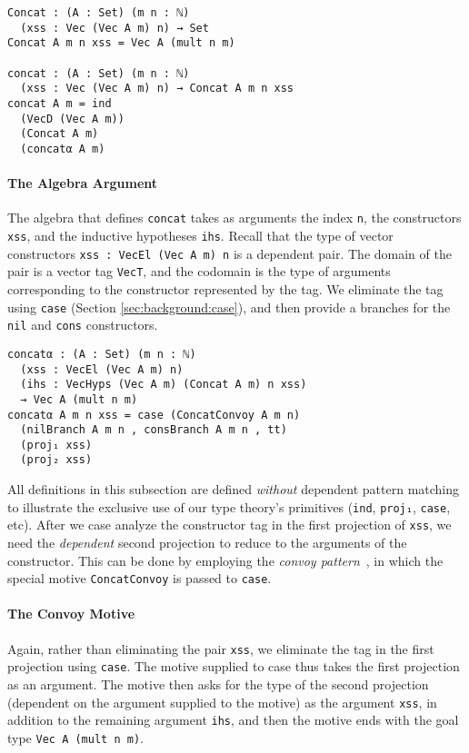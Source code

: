 \documentclass[preprint,nonatbib]{sigplanconf}
\newcommand{\refsec}[1]{Section \ref{sec:#1}}
\begin{document}
\begin{verbatim}
Concat : (A : Set) (m n : ℕ)
  (xss : Vec (Vec A m) n) → Set
Concat A m n xss = Vec A (mult n m)

concat : (A : Set) (m n : ℕ)
  (xss : Vec (Vec A m) n) → Concat A m n xss
concat A m = ind
  (VecD (Vec A m))
  (Concat A m)
  (concatα A m)
\end{verbatim}

\paragraph{The Algebra Argument}

The algebra that defines {\tt concat} takes as arguments the index
{\tt n}, the constructors {\tt xss}, and the inductive hypotheses
{\tt ihs}. Recall that the type of vector constructors
{\tt xss : VecEl (Vec A m) n} is a dependent pair. The domain of the
pair is a vector tag {\tt VecT}, and the codomain is the type of
arguments corresponding to the constructor represented by the tag. We
eliminate the tag using {\tt case} (\refsec{background:case}), and
then provide a branches for the {\tt nil} and {\tt cons} constructors.

\begin{verbatim}
concatα : (A : Set) (m n : ℕ)
  (xss : VecEl (Vec A m) n)
  (ihs : VecHyps (Vec A m) (Concat A m) n xss)
  → Vec A (mult n m)
concatα A m n xss = case (ConcatConvoy A m n)
  (nilBranch A m n , consBranch A m n , tt)
  (proj₁ xss)
  (proj₂ xss)
\end{verbatim}

All definitions in this subsection are defined {\it without} dependent
pattern matching to illustrate the exclusive use of our type theory's
primitives ({\tt ind}, {\tt proj₁}, {\tt case}, etc). After we case
analyze the constructor tag in the first projection of {\tt xss}, we
need the {\it dependent} second projection to reduce to the arguments
of the constructor. This can be done by employing the
{\it convoy pattern}~\citep{TODO}, in which the special motive
{\tt ConcatConvoy} is passed to {\tt case}.

\paragraph{The Convoy Motive}

Again, rather than eliminating the pair {\tt xss}, we eliminate the
tag in the first projection using {\tt case}. The motive supplied to
case thus takes the first projection as an argument. The motive then
asks for the type of the second projection (dependent on the argument
supplied to the motive) as the argument {\tt xss}, in addition to the
remaining argument {\tt ihs}, and then the motive ends with the goal type
{\tt Vec A (mult n m)}.
\end{document}
